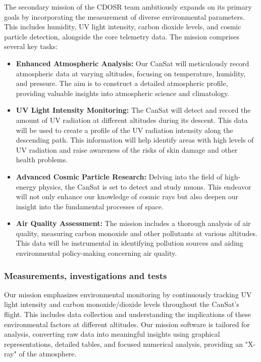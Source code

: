 The secondary mission of the CDOSR team ambitiously expands on its primary goals by incorporating the measurement of diverse environmental parameters. This includes humidity, UV light intensity, carbon dioxide levels, and cosmic particle detection, alongside the core telemetry data. The mission comprises several key tasks:
\begin{itemize}[leftmargin=1.27cm, itemindent=0cm, topsep=2pt, label=\faTasks]
    \item {\textbf{Enhanced Atmospheric Analysis:}} Our CanSat will meticulously record atmospheric data at varying altitudes, focusing on temperature, humidity, and pressure. The aim is to construct a detailed atmospheric profile, providing valuable insights into atmospheric science and climatology.
    \item {\textbf{UV Light Intensity Monitoring:}} The CanSat will detect and record the amount of UV radiation at different altitudes during its descent. This data will be used to create a profile of the UV radiation intensity along the descending path. This information will help identify areas with high levels of UV radiation and raise awareness of the risks of skin damage and other health problems.
    \item {\textbf{Advanced Cosmic Particle Research:}} Delving into the field of high-energy physics, the CanSat is set to detect and study muons. This endeavor will not only enhance our knowledge of cosmic rays but also deepen our insight into the fundamental processes of space.
    \item {\textbf{Air Quality Assessment:}} The mission includes a thorough analysis of air quality, measuring carbon monoxide and other pollutants at various altitudes. This data will be instrumental in identifying pollution sources and aiding environmental policy-making concerning air quality.
\end{itemize}

\subsubsection{Measurements, investigations and tests}
Our mission emphasizes environmental monitoring by continuously tracking UV light intensity and carbon monoxide/dioxide levels throughout the CanSat's flight. This includes data collection and understanding the implications of these environmental factors at different altitudes. Our mission software is tailored for analysis, converting raw data into meaningful insights using graphical representations, detailed tables, and focused numerical analysis, providing an "X-ray" of the atmosphere.

